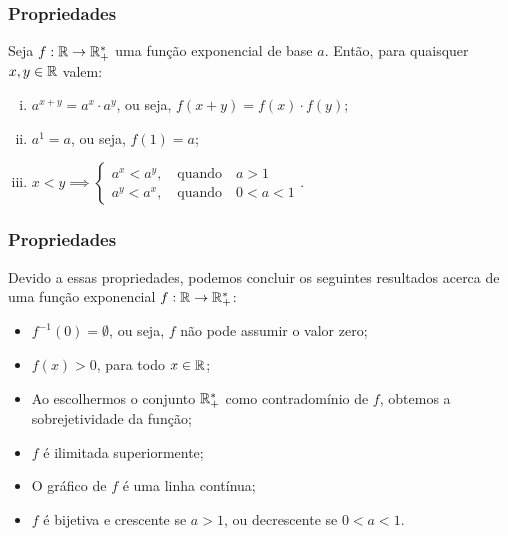 \documentclass[brazil, notheorems, 10pt]{beamer}
\begin{document}
\begin{frame}
\frametitle{Propriedades} %

\begin{Prop}
Seja $f: \mathbb{R} \to \mathbb{R}_+^\ast$ uma função exponencial de base $a$.
Então, para quaisquer $x, y \in \mathbb{R}$ valem:
\begin{enumerate}[(i)]
	\item  $a^{x+y} = a^x\cdot a^y$, ou seja, $f(x+y) = f(x)\cdot f(y)$;
	\item $a^1 = a$, ou seja, $f(1) = a$;
	\item $x<y \implies \begin{cases} a^x < a^y, \ \ \ \text{ quando } \ \ \ a>1 \\
																		a^y < a^x, \ \ \ \text{ quando } \ \ \ 0<a<1
											 \end{cases}.$
\end{enumerate}
\end{Prop}




\end{frame}


\begin{frame}
\frametitle{Propriedades} %

Devido a essas propriedades, podemos concluir os seguintes
resultados acerca de uma função exponencial $f: \mathbb{R} \to \mathbb{R}_+^\ast$:
\begin{itemize}
	\item $f^{-1}(0) = \emptyset$, ou seja, $f$ não pode assumir o valor
	zero;
	\item $f(x)>0$, para todo $x \in \mathbb{R}$;
	\item Ao escolhermos o conjunto $\mathbb{R}_+^\ast$ como contradomínio de $f$, obtemos
	a sobrejetividade da função;
	\item $f$ é ilimitada superiormente;
	\item O gráfico de $f$ é uma linha contínua;
	\item $f$ é bijetiva e crescente se $a>1$, ou decrescente se
	$0<a<1$.
\end{itemize}
\end{frame}



\end{document}
